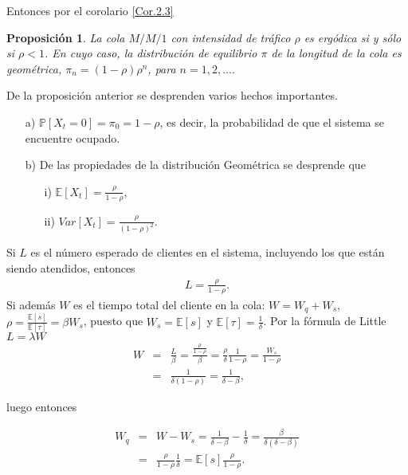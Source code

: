 \documentclass{article}
\newtheorem{Prop}{Proposición}
\newcommand{\esp}{\mathbb{E}}
\newcommand{\prob}{\mathbb{P}}
\begin{document}
Entonces por el corolario \ref{Cor.2.3}

\begin{Prop}
La cola $M/M/1$ con intensidad de tr\'afico $\rho$ es erg\'odica si y s\'olo si $\rho<1$. En cuyo caso, la distribuci\'on de equilibrio $\pi$ de la longitud de la cola es geom\'etrica, $\pi_{n}=\left(1-\rho\right)\rho^{n}$, para $n=1,2,\ldots$.
\end{Prop}

De la proposici\'on anterior se desprenden varios hechos importantes.
\begin{itemize}
\item[a) ] $\prob\left[X_{t}=0\right]=\pi_{0}=1-\rho$, es decir, la probabilidad de que el sistema se encuentre ocupado.
\item[b) ] De las propiedades de la distribuci\'on Geom\'etrica se desprende que
\begin{itemize}
\item[i) ] $\esp\left[X_{t}\right]=\frac{\rho}{1-\rho}$,
\item[ii) ] $Var\left[X_{t}\right]=\frac{\rho}{\left(1-\rho\right)^{2}}$.
\end{itemize}
\end{itemize}

Si $L$ es el n\'umero esperado de clientes en el sistema, incluyendo los que est\'an siendo atendidos, entonces
\begin{eqnarray}
L=\frac{\rho}{1-\rho}.
\end{eqnarray}
Si adem\'as $W$ es el tiempo total del cliente en la cola: $W=W_{q}+W_{s}$, $\rho=\frac{\esp\left[s\right]}{\esp\left[\tau\right]}=\beta W_{s}$, puesto que $W_{s}=\esp\left[s\right]$ y $\esp\left[\tau\right]=\frac{1}{\delta}$. Por la f\'ormula de Little $L=\lambda W$
\begin{eqnarray*}
W&=&\frac{L}{\beta}=\frac{\frac{\rho}{1-\rho}}{\beta}=\frac{\rho}{\delta}\frac{1}{1-\rho}=\frac{W_{s}}{1-\rho}\\
&=&\frac{1}{\delta\left(1-\rho\right)}=\frac{1}{\delta-\beta},
\end{eqnarray*}

luego entonces

\begin{eqnarray*}
W_{q}&=&W-W_{s}=\frac{1}{\delta-\beta}-\frac{1}{\delta}=\frac{\beta}{\delta(\delta-\beta)}\\
&=&\frac{\rho}{1-\rho}\frac{1}{\delta}=\esp\left[s\right]\frac{\rho}{1-\rho}.
\end{eqnarray*}
\end{document}
